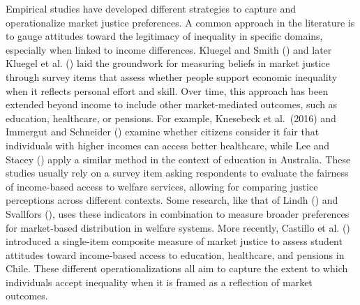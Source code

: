 \documentclass[
  12pt,
]{article}
\begin{document}
Empirical studies have developed different strategies to capture and
operationalize market justice preferences. A common approach in the
literature is to gauge attitudes toward the legitimacy of inequality in
specific domains, especially when linked to income differences. Kluegel
and Smith () and later Kluegel
et al. () laid the
groundwork for measuring beliefs in market justice through survey items
that assess whether people support economic inequality when it reflects
personal effort and skill. Over time, this approach has been extended
beyond income to include other market-mediated outcomes, such as
education, healthcare, or pensions. For example, Knesebeck et al.~(2016)
and Immergut and Schneider ()
examine whether citizens consider it fair that individuals with higher
incomes can access better healthcare, while Lee and Stacey
() apply a similar method in the
context of education in Australia. These studies usually rely on a
survey item asking respondents to evaluate the fairness of income-based
access to welfare services, allowing for comparing justice perceptions
across different contexts. Some research, like that of Lindh
() and Svallfors
(), uses these indicators
in combination to measure broader preferences for market-based
distribution in welfare systems. More recently, Castillo et al.
() introduced a
single-item composite measure of market justice to assess student
attitudes toward income-based access to education, healthcare, and
pensions in Chile. These different operationalizations all aim to
capture the extent to which individuals accept inequality when it is
framed as a reflection of market outcomes.
\end{document}
